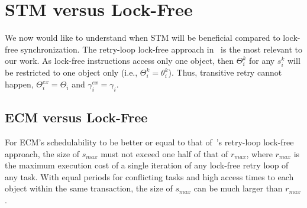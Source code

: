 \section{STM versus Lock-Free}
\label{sec:comparison}
%
We now would like to understand when STM will be beneficial compared to lock-free synchronization. The retry-loop lock-free approach in~\cite{key-5} is the most relevant to our work. As lock-free instructions access only one object, then $\Theta_i^k$ for any $s_i^k$ will be restricted to one object only (i.e., $\Theta_i^k=\theta_i^k$). Thus, transitive retry cannot happen, $\Theta_i^{ex}=\Theta_i$ and $\gamma_i^{ex}=\gamma_i$.
%
\subsection{ECM versus Lock-Free}\label{sub:G-EDF-scheduler-with}
%
\begin{clm}\label{clm:ecm_lf_schedulability_cmp}
%
For ECM's schedulability to be better or equal to that of~\cite{key-5}'s retry-loop lock-free approach, the size of $s_{max}$ must not exceed one half of that of $r_{max}$, where $r_{max}$ is the maximum execution cost of a single iteration of any lock-free retry loop of any task. With equal periods for conflicting tasks and high access times to each object within the same transaction, the size of $s_{max}$ can be much larger than $r_{max}$.
%
\end{clm}
%

